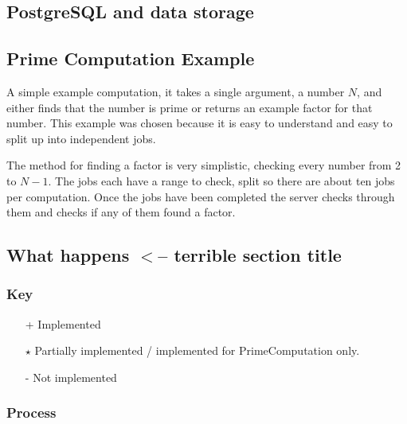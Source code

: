 \documentclass[a4paper,10pt]{article}
\begin{document}
\subsection{PostgreSQL and data storage}

\subsection{Prime Computation Example}

A simple example computation, it takes a single argument, a number $N$, and either finds that the number is prime or returns an example factor for that number.
This example was chosen because it is easy to understand and easy to split up into independent jobs.

The method for finding a factor is very simplistic, checking every number from 2 to $N-1$. The jobs each have a range to check, split so there are about ten jobs per computation.
Once the jobs have been completed the server checks through them and checks if any of them found a factor.

\subsection{What happens $<$-- terrible section title}

\subsubsection{Key}
\begin{itemize}
\item[+] Implemented
\item[$\star$] Partially implemented / implemented for PrimeComputation only.
\item[-] Not implemented
\end{itemize}

\subsubsection{Process}
\end{document}
